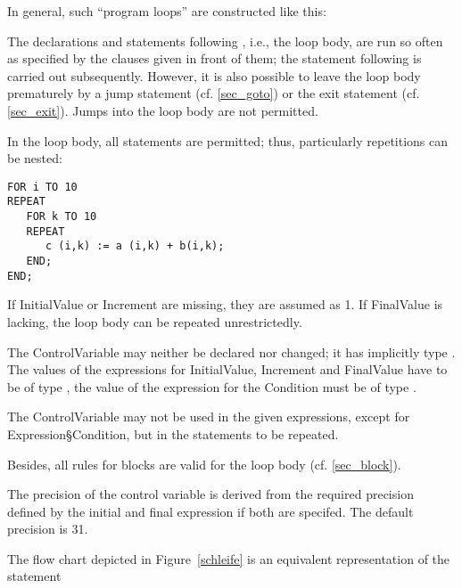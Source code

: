 In general, such ``program loops'' are constructed like this:

\begin{grammarframe}


\end{grammarframe}
The declarations and statements following , i.e., the loop body,
are run so often as specified by the clauses given in front of them; the
statement following  is carried out subsequently. However, it is also
possible to leave the loop body prematurely by a jump statement (cf. \ref{sec_goto})
or the exit statement (cf. \ref{sec_exit}). Jumps into the loop body are not permitted.

In the loop body, all statements are permitted; thus, particularly
repetitions can be nested:

\begin{lstlisting}
FOR i TO 10
REPEAT
   FOR k TO 10 
   REPEAT 
      c (i,k) := a (i,k) + b(i,k);
   END;
END;
\end{lstlisting}

If InitialValue or Increment are missing, they are assumed as 1. 
If FinalValue is lacking, the loop body can be repeated unrestrictedly.

The ControlVariable may neither be declared nor changed; it has
implicitly type . The values of the expressions for InitialValue,
Increment and FinalValue have to be of type , the value of the
expression for the Condition must be of type .

The ControlVariable may not be used in the given expressions, except
for Expression\S Condition, but in the statements to be repeated.

Besides, all rules for blocks are valid for the loop body (cf. \ref{sec_block}).

The precision of the control variable is derived from the
required precision defined by the initial and final expression if both are
specifed.
The default precision is 31.

The flow chart depicted in Figure~\ref{schleife} is an equivalent representation of the
statement

